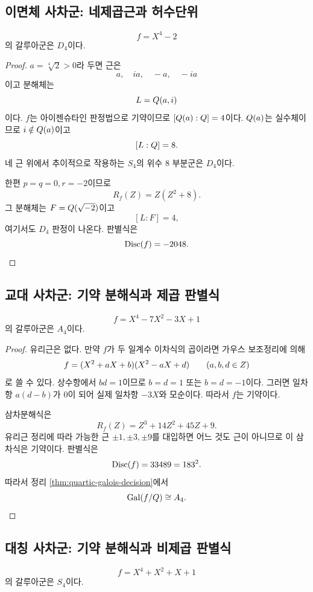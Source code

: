 \subsection{이면체 사차군: 네제곱근과 허수단위}

\begin{example}
\label{ex:quartic-d4}
\[
  f=X^4-2
\]
의 갈루아군은 $D_4$이다.
\end{example}

\begin{proof}
$a=\sqrt[4]{2}>0$라 두면 근은
\[
  a,\quad ia,\quad -a,\quad -ia
\]
이고 분해체는
\[
  L=Q(a,i)
\]
이다. $f$는 아이젠슈타인 판정법으로 기약이므로 $[Q(a):Q]=4$이다. $Q(a)$는 실수체이므로 $i\notin Q(a)$이고
\[
  [L:Q]=8.
\]
네 근 위에서 추이적으로 작용하는 $S_4$의 위수 $8$ 부분군은 $D_4$이다.

한편 $p=q=0,r=-2$이므로
\[
  R_f(Z)=Z(Z^2+8).
\]
그 분해체는 $F=Q(\sqrt{-2})$이고
\[
  [L:F]=4,
\]
여기서도 $D_4$ 판정이 나온다. 판별식은
\[
  \operatorname{Disc}(f)=-2048.
\]
\end{proof}

\subsection{교대 사차군: 기약 분해식과 제곱 판별식}

\begin{example}
\label{ex:quartic-a4}
\[
  f=X^4-7X^2-3X+1
\]
의 갈루아군은 $A_4$이다.
\end{example}

\begin{proof}
유리근은 없다. 만약 $f$가 두 일계수 이차식의 곱이라면 가우스 보조정리에 의해
\[
  f=(X^2+aX+b)(X^2-aX+d)
  \qquad(a,b,d\in Z)
\]
로 쓸 수 있다. 상수항에서 $bd=1$이므로 $b=d=1$ 또는 $b=d=-1$이다. 그러면 일차항 $a(d-b)$가 $0$이 되어 실제 일차항 $-3X$와 모순이다. 따라서 $f$는 기약이다.

삼차분해식은
\[
  R_f(Z)=Z^3+14Z^2+45Z+9.
\]
유리근 정리에 따라 가능한 근 $\pm1,\pm3,\pm9$를 대입하면 어느 것도 근이 아니므로 이 삼차식은 기약이다. 판별식은
\[
  \operatorname{Disc}(f)=33489=183^2.
\]
따라서 정리 \ref{thm:quartic-galois-decision}에서
\[
  \operatorname{Gal}(f/Q)\cong A_4.
\]
\end{proof}

\subsection{대칭 사차군: 기약 분해식과 비제곱 판별식}

\begin{example}
\label{ex:quartic-s4}
\[
  f=X^4+X^2+X+1
\]
의 갈루아군은 $S_4$이다.
\end{example}

